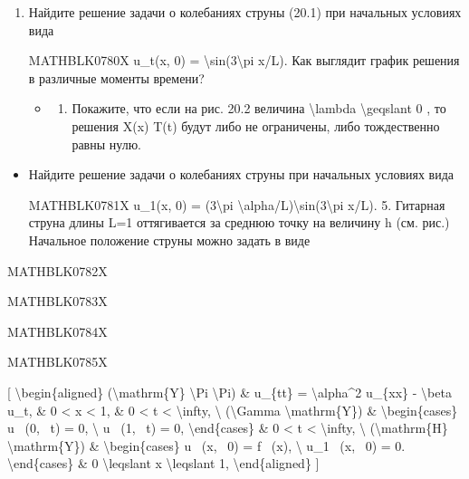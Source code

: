 \documentclass[
]{article}
\providecommand{\tightlist}{%
  \setlength{\itemsep}{0pt}\setlength{\parskip}{0pt}}
\begin{document}
\begin{enumerate}
\def\labelenumi{\arabic{enumi}.}
\setcounter{enumi}{1}
\item
  Найдите решение задачи о колебаниях струны (20.1) при начальных
  условиях вида

  MATHBLK0780X u\_t(x, 0) = \textbackslash sin(3\textbackslash pi x/L).
  Как выглядит график решения в различные моменты времени?

  \begin{itemize}
  \tightlist
  \item
    \begin{enumerate}
    \def\labelenumii{\arabic{enumii}.}
    \setcounter{enumii}{2}
    \tightlist
    \item
      Покажите, что если на рис. 20.2 величина \textbackslash lambda
      \textbackslash geqslant 0 , то решения X(x) T(t) будут либо не
      ограничены, либо тождественно равны нулю.
    \end{enumerate}
  \end{itemize}
\end{enumerate}

\begin{itemize}
\item
  Найдите решение задачи о колебаниях струны при начальных условиях вида

  MATHBLK0781X u\_1(x, 0) = (3\textbackslash pi
  \textbackslash alpha/L)\textbackslash sin(3\textbackslash pi x/L). 5.
  Гитарная струна длины L=1 оттягивается за среднюю точку на величину h
  (см. рис.) Начальное положение струны можно задать в виде
\end{itemize}

MATHBLK0782X

MATHBLK0783X

MATHBLK0784X

MATHBLK0785X

{[} \textbackslash begin\{aligned\} (\textbackslash mathrm\{Y\}
\textbackslash Pi \textbackslash Pi) \& u\_\{tt\} =
\textbackslash alpha\^{}2 u\_\{xx\} - \textbackslash beta u\_t, \& 0
\textless{} x \textless{} 1, \& 0 \textless{} t \textless{}
\textbackslash infty, \textbackslash{} (\textbackslash Gamma
\textbackslash mathrm\{Y\}) \& \textbackslash begin\{cases\} u ~(0, ~t)
= 0, \textbackslash{} u ~(1, ~t) = 0, \textbackslash end\{cases\} \& 0
\textless{} t \textless{} \textbackslash infty, \textbackslash{}
(\textbackslash mathrm\{H\} \textbackslash mathrm\{Y\}) \&
\textbackslash begin\{cases\} u ~(x, ~0) = f ~(x), \textbackslash{} u\_1
~(x, ~0) = 0. \textbackslash end\{cases\} \& 0 \textbackslash leqslant x
\textbackslash leqslant 1, \textbackslash end\{aligned\} {]}
\end{document}
